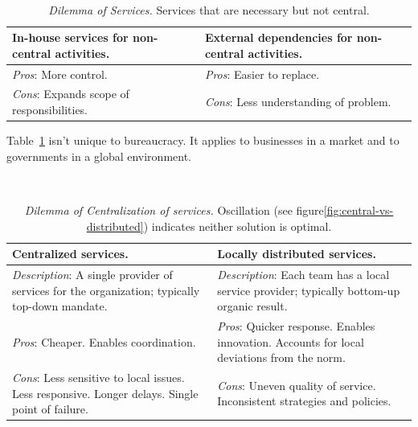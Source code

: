 \ \\

\begin{center}
\begin{table}[H] %
\begin{tabular}{ | m{\dilemmatablewidth}| m{\dilemmatablewidth} | } 
  \hline
  \textbf{In-house services for non-central activities.} &
  \textbf{External dependencies for non-central activities.} \\
  \hline
  \textit{Pros}: More control. &
  \textit{Pros}: Easier to replace. \\
  \hline
  \textit{Cons}: Expands scope of responsibilities. & 
  \textit{Cons}: Less understanding of problem.  \\
  \hline
\end{tabular}
\caption{\textit{Dilemma of Services.}
Services that are necessary but not central.
}
\label{table:inhouse-vs-external}
\end{table}
\end{center}

Table~\ref{table:inhouse-vs-external} isn't unique to bureaucracy. It applies to businesses in a market and to governments in a global environment. 

\ \\

\begin{center}
\begin{table}[H] %
\begin{tabular}{ | m{\dilemmatablewidth}| m{\dilemmatablewidth} | } 
  \hline
  \textbf{Centralized services.} &
  \textbf{Locally distributed services.} \\
  \hline
  \textit{Description}: A single provider of services for the organization; typically top-down mandate. &
  \textit{Description}: Each team has a local service provider; typically bottom-up organic result. \\  
  \hline
  \textit{Pros}: Cheaper. Enables coordination. &
  \textit{Pros}: Quicker response. 
  Enables innovation. 
  Accounts for local deviations from the norm. \\
  \hline
  \textit{Cons}: Less sensitive to local issues. Less responsive. Longer delays. Single point of failure.  & 
  \textit{Cons}: Uneven quality of service. Inconsistent strategies and policies. \\
  \hline
\end{tabular}
\caption{\textit{Dilemma of Centralization of services.} Oscillation (see figure\ref{fig:central-vs-distributed}) indicates neither solution is optimal.
}
\label{table:central-vs-distributed}
\end{table}
\end{center}


